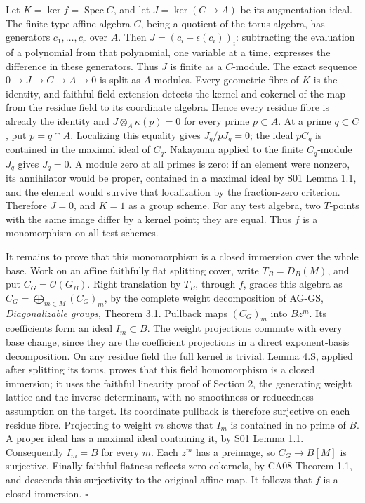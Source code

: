 \documentclass[11pt,a4paper,openany]{report}
\begin{document}
Let \(K=\ker f=\operatorname{Spec}C\), and let \(J=\ker(C\to A)\) be its augmentation ideal. The finite-type affine algebra \(C\), being a quotient of the torus algebra, has generators \(c_1,\ldots,c_r\) over \(A\). Then \(J=(c_i-\epsilon(c_i))_i\): subtracting the evaluation of a polynomial from that polynomial, one variable at a time, expresses the difference in these generators. Thus \(J\) is finite as a \(C\)-module. The exact sequence \(0\to J\to C\to A\to0\) is split as \(A\)-modules. Every geometric fibre of \(K\) is the identity, and faithful field extension detects the kernel and cokernel of the map from the residue field to its coordinate algebra. Hence every residue fibre is already the identity and \(J\otimes_A\kappa(p)=0\) for every prime \(p\subset A\). At a prime \(q\subset C\), put \(p=q\cap A\). Localizing this equality gives \(J_q/pJ_q=0\); the ideal \(pC_q\) is contained in the maximal ideal of \(C_q\). Nakayama applied to the finite \(C_q\)-module \(J_q\) gives \(J_q=0\). A module zero at all primes is zero: if an element were nonzero, its annihilator would be proper, contained in a maximal ideal by S01 Lemma 1.1, and the element would survive that localization by the fraction-zero criterion. Therefore \(J=0\), and \(K=1\) as a group scheme. For any test algebra, two \(T\)-points with the same image differ by a kernel point; they are equal. Thus \(f\) is a monomorphism on all test schemes.

It remains to prove that this monomorphism is a closed immersion over the whole base. Work on an affine faithfully flat splitting cover, write \(T_B=D_B(M)\), and put \(C_G=\mathcal O(G_B)\). Right translation by \(T_B\), through \(f\), grades this algebra as \(C_G=\bigoplus_{m\in M}(C_G)_m\), by the complete weight decomposition of AG-GS, \emph{Diagonalizable groups}, Theorem 3.1. Pullback maps \((C_G)_m\) into \(Bz^m\). Its coefficients form an ideal \(I_m\subset B\). The weight projections commute with every base change, since they are the coefficient projections in a direct exponent-basis decomposition. On any residue field the full kernel is trivial. Lemma 4.S, applied after splitting its torus, proves that this field homomorphism is a closed immersion; it uses the faithful linearity proof of Section 2, the generating weight lattice and the inverse determinant, with no smoothness or reducedness assumption on the target. Its coordinate pullback is therefore surjective on each residue fibre. Projecting to weight \(m\) shows that \(I_m\) is contained in no prime of \(B\). A proper ideal has a maximal ideal containing it, by S01 Lemma 1.1. Consequently \(I_m=B\) for every \(m\). Each \(z^m\) has a preimage, so \(C_G\to B[M]\) is surjective. Finally faithful flatness reflects zero cokernels, by CA08 Theorem 1.1, and descends this surjectivity to the original affine map. It follows that \(f\) is a closed immersion. \(\square\)
\end{document}
